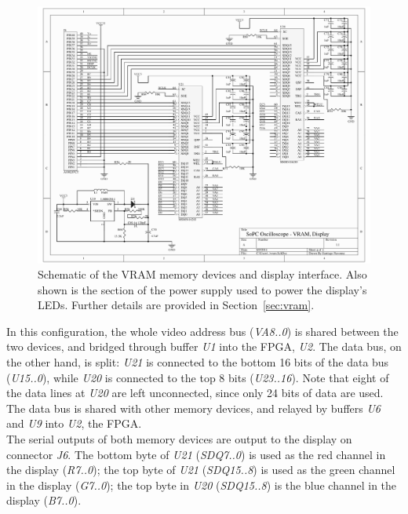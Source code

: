\documentclass[titlepage]{scrartcl}
\begin{document}
	\begin{figure}[h!]
	\vspace{-2cm}
	\centerline{\includegraphics[width=26cm, angle=90, origin=c]{img/vram_disp.pdf}}
                	\caption{Schematic of the VRAM memory devices and display interface. Also shown is the section of the power supply used to power the display's LEDs. Further details are provided in Section~\ref{sec:vram}.}
               	\label{fig:vram_disp}
	\end{figure}

	 In this configuration, the whole video address bus (\textit{VA8..0}) is shared between the two devices, and bridged through buffer \textit{U1} into the FPGA, \textit{U2}. The data bus, on the other hand, is split: \textit{U21} is connected to the bottom 16 bits of the data bus (\textit{U15..0}), while \textit{U20} is connected to the top 8 bits (\textit{U23..16}). Note that eight of the data lines at \textit{U20} are left unconnected, since only 24 bits of data are used. The data bus is shared with other memory devices, and relayed by buffers \textit{U6} and \textit{U9} into \textit{U2}, the FPGA.\\

	The serial outputs of both memory devices are output to the display on connector \textit{J6}. The bottom byte of \textit{U21} (\textit{SDQ7..0}) is used as the red channel in the display (\textit{R7..0}); the top byte of \textit{U21} (\textit{SDQ15..8}) is used as the green channel in the display (\textit{G7..0}); the top byte in \textit{U20} (\textit{SDQ15..8}) is the blue channel in the display (\textit{B7..0}).\\
\end{document}
